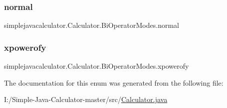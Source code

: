 \subsubsection{\texorpdfstring{normal}{normal}}
{\footnotesize\ttfamily simplejavacalculator.\+Calculator.\+Bi\+Operator\+Modes.\+normal}

\mbox{\label{enumsimplejavacalculator_1_1_calculator_1_1_bi_operator_modes_a76a04cd587b521a7cea7acc8b1d6c0de}} 
\subsubsection{\texorpdfstring{xpowerofy}{xpowerofy}}
{\footnotesize\ttfamily simplejavacalculator.\+Calculator.\+Bi\+Operator\+Modes.\+xpowerofy}



The documentation for this enum was generated from the following file\+:\begin{DoxyCompactItemize}
\item 
I\+:/\+Simple-\/\+Java-\/\+Calculator-\/master/src/\mbox{\hyperlink{_calculator_8java}{Calculator.\+java}}\end{DoxyCompactItemize}

